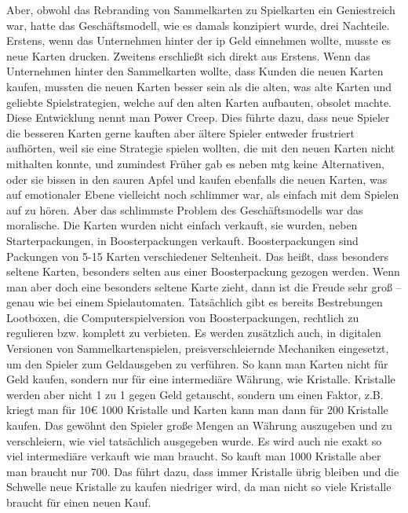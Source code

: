 \documentclass[fontsize=12, a4aper]{scrartcl}
\begin{document}
\noindent Aber, obwohl das Rebranding von Sammelkarten zu Spielkarten ein Geniestreich war, hatte das Geschäftsmodell, wie es damals konzipiert wurde, drei Nachteile. Erstens, wenn das Unternehmen hinter der \ac{ip} Geld einnehmen wollte, musste es neue Karten drucken. Zweitens erschließt sich direkt aus Erstens. Wenn das Unternehmen hinter den Sammelkarten wollte, dass Kunden die neuen Karten kaufen, mussten die neuen Karten besser sein als die alten, was alte Karten und geliebte Spielstrategien, welche auf den alten Karten aufbauten, obsolet machte. Diese Entwicklung nennt man \glqq Power Creep\grqq. Dies führte dazu, dass neue Spieler die besseren Karten gerne kauften aber ältere Spieler entweder frustriert aufhörten, weil sie eine Strategie spielen wollten, die mit den neuen Karten nicht mithalten konnte, und zumindest Früher gab es neben \ac{mtg} keine Alternativen, oder sie bissen in den sauren Apfel und kaufen ebenfalls die neuen Karten, was auf emotionaler Ebene vielleicht noch schlimmer war, als einfach mit dem Spielen auf zu hören. Aber das schlimmste Problem des Geschäftsmodells war das moralische. Die Karten wurden nicht einfach verkauft, sie wurden, neben Starterpackungen, in Boosterpackungen verkauft. Boosterpackungen sind Packungen von 5-15 Karten verschiedener Seltenheit. Das heißt, dass besonders seltene Karten, besonders selten aus einer Boosterpackung gezogen werden. Wenn man aber doch eine besonders seltene Karte zieht, dann ist die Freude sehr groß -- genau wie bei einem Spielautomaten. Tatsächlich gibt es bereits Bestrebungen Lootboxen, die Computerspielversion von Boosterpackungen, rechtlich zu regulieren bzw. komplett zu verbieten. Es werden zusätzlich auch, in digitalen Versionen von Sammelkartenspielen, preisverschleiernde Mechaniken eingesetzt, um den Spieler zum Geldausgeben zu verführen. So kann man Karten nicht für Geld kaufen, sondern nur für eine intermediäre Währung, wie Kristalle. Kristalle werden aber nicht 1 zu 1 gegen Geld getauscht, sondern um einen Faktor, z.B. kriegt man für 10€ 1000 Kristalle und Karten kann man dann für 200 Kristalle kaufen. Das gewöhnt den Spieler große Mengen an Währung auszugeben und zu verschleiern, wie viel tatsächlich ausgegeben wurde. Es wird auch nie exakt so viel intermediäre verkauft wie man braucht. So kauft man 1000 Kristalle aber man braucht nur 700. Das führt dazu, dass immer Kristalle übrig bleiben und die Schwelle neue Kristalle zu kaufen niedriger wird, da man nicht so viele Kristalle braucht für einen neuen Kauf.\hfill\newline
\end{document}
